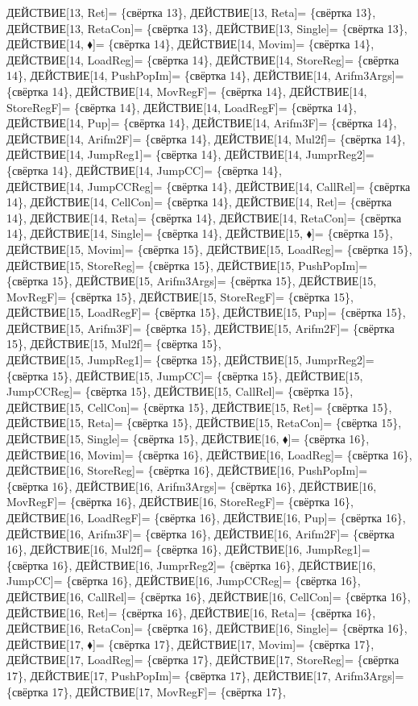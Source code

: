 \documentclass[a0]{a0poster}
\begin{document}
ДЕЙСТВИЕ[13, Ret]= \{свёртка 13\}, ДЕЙСТВИЕ[13, Reta]= \{свёртка 13\}, ДЕЙСТВИЕ[13, RetaCon]= \{свёртка 13\}, ДЕЙСТВИЕ[13, Single]= \{свёртка 13\}, ДЕЙСТВИЕ[14, $\blacklozenge$]= \{свёртка 14\}, ДЕЙСТВИЕ[14, Movim]= \{свёртка 14\}, ДЕЙСТВИЕ[14, LoadReg]= \{свёртка 14\}, ДЕЙСТВИЕ[14, StoreReg]= \{свёртка 14\}, ДЕЙСТВИЕ[14, PushPopIm]= \{свёртка 14\}, ДЕЙСТВИЕ[14, Arifm3Args]= \{свёртка 14\}, ДЕЙСТВИЕ[14, MovRegF]= \{свёртка 14\}, ДЕЙСТВИЕ[14, StoreRegF]= \{свёртка 14\}, ДЕЙСТВИЕ[14, LoadRegF]= \{свёртка 14\}, ДЕЙСТВИЕ[14, Pup]= \{свёртка 14\}, ДЕЙСТВИЕ[14, Arifm3F]= \{свёртка 14\}, ДЕЙСТВИЕ[14, Arifm2F]= \{свёртка 14\}, ДЕЙСТВИЕ[14, Mul2f]= \{свёртка 14\}, ДЕЙСТВИЕ[14, JumpReg1]= \{свёртка 14\}, ДЕЙСТВИЕ[14, JumprReg2]= \{свёртка 14\}, ДЕЙСТВИЕ[14, JumpCC]= \{свёртка 14\}, \\
ДЕЙСТВИЕ[14, JumpCCReg]= \{свёртка 14\}, ДЕЙСТВИЕ[14, CallRel]= \{свёртка 14\}, ДЕЙСТВИЕ[14, CellCon]= \{свёртка 14\}, ДЕЙСТВИЕ[14, Ret]= \{свёртка 14\}, ДЕЙСТВИЕ[14, Reta]= \{свёртка 14\}, ДЕЙСТВИЕ[14, RetaCon]= \{свёртка 14\}, ДЕЙСТВИЕ[14, Single]= \{свёртка 14\}, ДЕЙСТВИЕ[15, $\blacklozenge$]= \{свёртка 15\}, ДЕЙСТВИЕ[15, Movim]= \{свёртка 15\}, ДЕЙСТВИЕ[15, LoadReg]= \{свёртка 15\}, ДЕЙСТВИЕ[15, StoreReg]= \{свёртка 15\}, ДЕЙСТВИЕ[15, PushPopIm]= \{свёртка 15\}, ДЕЙСТВИЕ[15, Arifm3Args]= \{свёртка 15\}, ДЕЙСТВИЕ[15, MovRegF]= \{свёртка 15\}, ДЕЙСТВИЕ[15, StoreRegF]= \{свёртка 15\}, ДЕЙСТВИЕ[15, LoadRegF]= \{свёртка 15\}, ДЕЙСТВИЕ[15, Pup]= \{свёртка 15\}, ДЕЙСТВИЕ[15, Arifm3F]= \{свёртка 15\}, ДЕЙСТВИЕ[15, Arifm2F]= \{свёртка 15\}, ДЕЙСТВИЕ[15, Mul2f]= \{свёртка 15\}, \\
ДЕЙСТВИЕ[15, JumpReg1]= \{свёртка 15\}, ДЕЙСТВИЕ[15, JumprReg2]= \{свёртка 15\}, ДЕЙСТВИЕ[15, JumpCC]= \{свёртка 15\}, ДЕЙСТВИЕ[15, JumpCCReg]= \{свёртка 15\}, ДЕЙСТВИЕ[15, CallRel]= \{свёртка 15\}, ДЕЙСТВИЕ[15, CellCon]= \{свёртка 15\}, ДЕЙСТВИЕ[15, Ret]= \{свёртка 15\}, ДЕЙСТВИЕ[15, Reta]= \{свёртка 15\}, ДЕЙСТВИЕ[15, RetaCon]= \{свёртка 15\}, ДЕЙСТВИЕ[15, Single]= \{свёртка 15\}, ДЕЙСТВИЕ[16, $\blacklozenge$]= \{свёртка 16\}, ДЕЙСТВИЕ[16, Movim]= \{свёртка 16\}, ДЕЙСТВИЕ[16, LoadReg]= \{свёртка 16\}, ДЕЙСТВИЕ[16, StoreReg]= \{свёртка 16\}, ДЕЙСТВИЕ[16, PushPopIm]= \{свёртка 16\}, ДЕЙСТВИЕ[16, Arifm3Args]= \{свёртка 16\}, ДЕЙСТВИЕ[16, MovRegF]= \{свёртка 16\}, ДЕЙСТВИЕ[16, StoreRegF]= \{свёртка 16\}, ДЕЙСТВИЕ[16, LoadRegF]= \{свёртка 16\}, ДЕЙСТВИЕ[16, Pup]= \{свёртка 16\}, \\
ДЕЙСТВИЕ[16, Arifm3F]= \{свёртка 16\}, ДЕЙСТВИЕ[16, Arifm2F]= \{свёртка 16\}, ДЕЙСТВИЕ[16, Mul2f]= \{свёртка 16\}, ДЕЙСТВИЕ[16, JumpReg1]= \{свёртка 16\}, ДЕЙСТВИЕ[16, JumprReg2]= \{свёртка 16\}, ДЕЙСТВИЕ[16, JumpCC]= \{свёртка 16\}, ДЕЙСТВИЕ[16, JumpCCReg]= \{свёртка 16\}, ДЕЙСТВИЕ[16, CallRel]= \{свёртка 16\}, ДЕЙСТВИЕ[16, CellCon]= \{свёртка 16\}, ДЕЙСТВИЕ[16, Ret]= \{свёртка 16\}, ДЕЙСТВИЕ[16, Reta]= \{свёртка 16\}, ДЕЙСТВИЕ[16, RetaCon]= \{свёртка 16\}, ДЕЙСТВИЕ[16, Single]= \{свёртка 16\}, ДЕЙСТВИЕ[17, $\blacklozenge$]= \{свёртка 17\}, ДЕЙСТВИЕ[17, Movim]= \{свёртка 17\}, ДЕЙСТВИЕ[17, LoadReg]= \{свёртка 17\}, ДЕЙСТВИЕ[17, StoreReg]= \{свёртка 17\}, ДЕЙСТВИЕ[17, PushPopIm]= \{свёртка 17\}, ДЕЙСТВИЕ[17, Arifm3Args]= \{свёртка 17\}, ДЕЙСТВИЕ[17, MovRegF]= \{свёртка 17\}, \\
\end{document}
